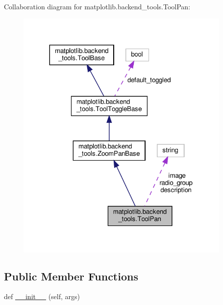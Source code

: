 Collaboration diagram for matplotlib.\+backend\+\_\+tools.\+Tool\+Pan\+:
\nopagebreak
\begin{figure}[H]
\begin{center}
\leavevmode
\includegraphics[width=299pt]{classmatplotlib_1_1backend__tools_1_1ToolPan__coll__graph}
\end{center}
\end{figure}
\subsection*{Public Member Functions}
\begin{DoxyCompactItemize}
\item 
def \hyperlink{classmatplotlib_1_1backend__tools_1_1ToolPan_a21261e1a6eec72e19f3fd9c37dae6e48}{\+\_\+\+\_\+init\+\_\+\+\_\+} (self, args)
\end{DoxyCompactItemize}
